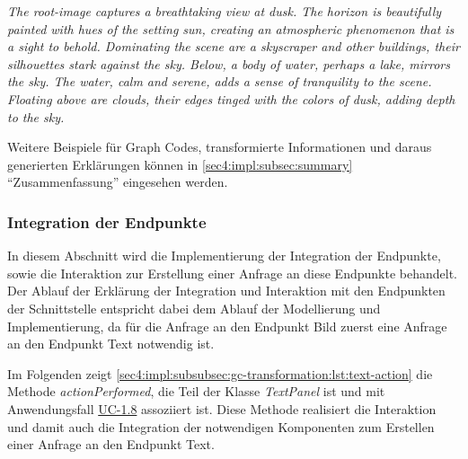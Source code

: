 \textit{The root-image captures a breathtaking view at dusk. The horizon is beautifully painted with hues of the setting sun, creating an atmospheric phenomenon that is a sight to behold. Dominating the scene are a skyscraper and other buildings, their silhouettes stark against the sky. Below, a body of water, perhaps a lake, mirrors the sky. The water, calm and serene, adds a sense of tranquility to the scene. Floating above are clouds, their edges tinged with the colors of dusk, adding depth to the sky.}

Weitere Beispiele für Graph Codes, transformierte Informationen und daraus generierten Erklärungen können in \cref{sec4:impl:subsec:summary} \enquote{Zusammenfassung} eingesehen werden.

\subsubsection{Integration der Endpunkte}
\label{sec4:impl:subsubsec:endpoint-integration}
In diesem Abschnitt wird die Implementierung der Integration der Endpunkte, sowie die Interaktion zur Erstellung einer Anfrage an diese Endpunkte behandelt.
Der Ablauf der Erklärung der Integration und Interaktion mit den Endpunkten der Schnittstelle entspricht dabei dem Ablauf der Modellierung und Implementierung, da für die Anfrage an den Endpunkt Bild zuerst eine Anfrage an den Endpunkt Text notwendig ist.

Im Folgenden zeigt \cref{sec4:impl:subsubsec:gc-transformation:lst:text-action} die Methode \textit{actionPerformed}, die Teil der Klasse \textit{TextPanel} ist und mit Anwendungsfall \hyperref[sec3:model:uc-1.8]{UC-1.8} assoziiert ist.
Diese Methode realisiert die Interaktion und damit auch die Integration der notwendigen Komponenten zum Erstellen einer Anfrage an den Endpunkt Text.




